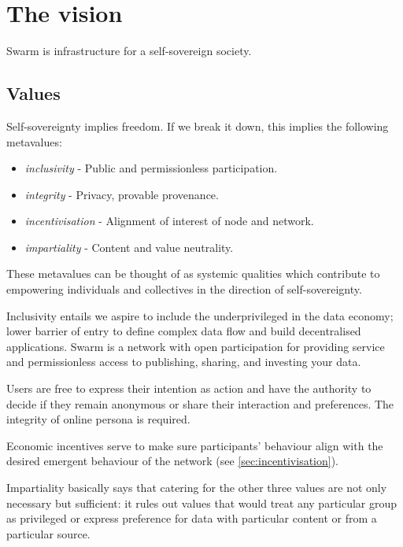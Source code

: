 \section{The vision  \statusorange}\label{sec:vision}


\begin{displayquote}
Swarm is infrastructure for a self-sovereign society. 
\end{displayquote}


\subsection{Values \statusorange}\label{sec:values}

Self-sovereignty implies freedom. If we break it down, this implies the following metavalues: 

\begin{itemize}
\item \emph{inclusivity} - Public and permissionless participation.  
\item \emph{integrity} - Privacy, provable provenance. 
\item \emph{incentivisation} - Alignment of interest of node and network.
\item \emph{impartiality} -  Content and value neutrality.  
\end{itemize}

These metavalues can be thought of as systemic qualities which contribute to empowering individuals and collectives in the direction of self-sovereignty.

Inclusivity entails we aspire to include the underprivileged in the data economy; lower barrier of entry to define complex data flow and build decentralised applications. Swarm is a network with open participation for providing service and permissionless access to publishing, sharing, and investing your data.

Users are free to express their intention as action and have the authority to decide if they remain anonymous or share their interaction and preferences. The integrity of online persona is required. 

Economic incentives serve to make sure participants' behaviour align with the desired emergent behaviour of the network (see \ref{sec:incentivisation}). 

Impartiality basically says that catering for the other three values are not only necessary but sufficient: it rules out values that would treat any particular group as privileged or express preference for data with particular content or from a particular source.


